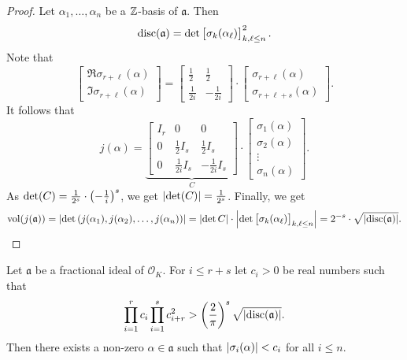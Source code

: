 \begin{proof}
Let $\alpha_1, \dots, \alpha_n$ be a $\mathbb{Z}$-basis of $\mathfrak{a}$.
Then
\[
\operatorname{disc}(\mathfrak{a}) =
\det \begin{bmatrix}
\sigma_k(\alpha_\ell)
\end{bmatrix}_{k, \ell \leq n}^2.
\]
Note that
\[
\begin{bmatrix}
\Re \sigma_{r+\ell}(\alpha) \\
\Im \sigma_{r+\ell}(\alpha)
\end{bmatrix}
=
\begin{bmatrix}
 \frac{1}{2} &  \frac{1}{2}  \\
\frac{1}{2i} & -\frac{1}{2i}
\end{bmatrix}
\cdot
\begin{bmatrix}
\sigma_{r+\ell}(\alpha)   \\
\sigma_{r+\ell+s}(\alpha)
\end{bmatrix}.
\]
It follows that
\[
j(\alpha) =
\underbrace{\begin{bmatrix}
I_r &        0         &        0          \\
 0  &  \frac{1}{2} I_s &  \frac{1}{2} I_s  \\
 0  & \frac{1}{2i} I_s & -\frac{1}{2i} I_s
\end{bmatrix}}_C
\cdot
\begin{bmatrix}
\sigma_1(\alpha) \\
\sigma_2(\alpha) \\
     \vdots      \\
\sigma_n(\alpha)
\end{bmatrix}.
\]
As $\det(C) = \frac{1}{2^s} \cdot \left(-\frac{1}{i}\right)^s$, we get
$\left\lvert \det(C)\right\rvert = \frac{1}{2^s}$. Finally, we get
\[
\operatorname{vol}(j(\mathfrak{a})) =
\left\lvert \det \left(j(\alpha_1), j(\alpha_2), \dots, j(\alpha_n)\right)\right\rvert =
\left\lvert \det C\right\rvert \cdot
\left\lvert \det \begin{bmatrix}
\sigma_k(\alpha_\ell)
\end{bmatrix}_{k, \ell \leq n}\right\rvert =
2^{-s} \cdot \sqrt{\left\lvert \operatorname{disc}(\mathfrak{a})\right\rvert}. \qedhere
\]
\end{proof}

\begin{izrek}
\label{mink:thm:bdb_disc_exist}
Let $\mathfrak{a}$ be a fractional ideal of $\mathcal{O}_K$. For
$i \leq r+s$ let $c_i > 0$ be real numbers such that
\[
\prod_{i=1}^r c_i \prod_{i=1}^s c_{i+r}^2 >
\left(\frac{2}{\pi}\right)^s \sqrt{\left\lvert \operatorname{disc}(\mathfrak{a})\right\rvert}.
\]
Then there exists a non-zero $\alpha \in \mathfrak{a}$ such that
$\left\lvert \sigma_i(\alpha)\right\rvert < c_i$ for all $i \leq n$.
\end{izrek}

